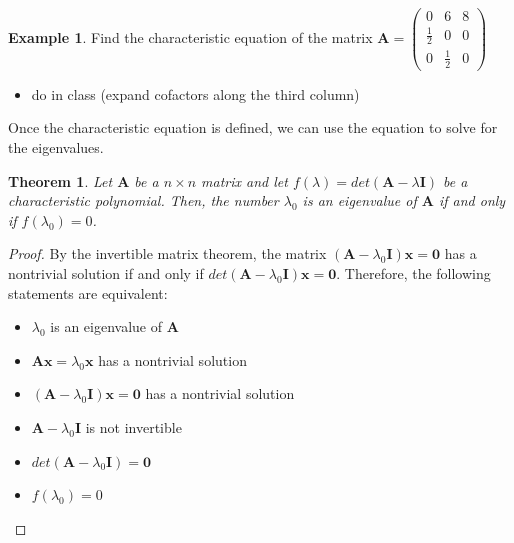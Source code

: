 \documentclass[
]{book}
\providecommand{\tightlist}{%
  \setlength{\itemsep}{0pt}\setlength{\parskip}{0pt}}
\newtheorem{theorem}{Theorem}[chapter]
\theoremstyle{definition}
\theoremstyle{definition}
\newtheorem{example}{Example}[chapter]
\theoremstyle{definition}
\theoremstyle{definition}
\theoremstyle{remark}
\begin{document}
\begin{example}

Find the characteristic equation of the matrix \(\mathbf{A} = \begin{pmatrix} 0 & 6 & 8 \\ \frac{1}{2} & 0 & 0 \\ 0 & \frac{1}{2} & 0 \end{pmatrix}\)

\begin{itemize}
\tightlist
\item
  do in class (expand cofactors along the third column)
\end{itemize}

\end{example}

Once the characteristic equation is defined, we can use the equation to solve for the eigenvalues.

\begin{theorem}
Let \(\mathbf{A}\) be a \(n \times n\) matrix and let \(f(\lambda) = det(\mathbf{A} - \lambda \mathbf{I})\) be a characteristic polynomial. Then, the number \(\lambda_0\) is an eigenvalue of \(\mathbf{A}\) if and only if \(f(\lambda_0) = 0\).
\end{theorem}

\begin{proof}

By the invertible matrix theorem, the matrix \((\mathbf{A} - \lambda_0 \mathbf{I}) \mathbf{x} = \mathbf{0}\) has a nontrivial solution if and only if \(det(\mathbf{A} - \lambda_0 \mathbf{I}) \mathbf{x} = \mathbf{0}\). Therefore, the following statements are equivalent:

\begin{itemize}
\item
  \(\lambda_0\) is an eigenvalue of \(\mathbf{A}\)
\item
  \(\mathbf{A} \mathbf{x} = \lambda_0 \mathbf{x}\) has a nontrivial solution
\item
  \((\mathbf{A} - \lambda_0 \mathbf{I}) \mathbf{x} = \mathbf{0}\) has a nontrivial solution
\item
  \(\mathbf{A} - \lambda_0 \mathbf{I}\) is not invertible
\item
  \(det(\mathbf{A} - \lambda_0 \mathbf{I}) = \mathbf{0}\)
\item
  \(f(\lambda_0) = 0\)
\end{itemize}

\end{proof}
\end{document}
